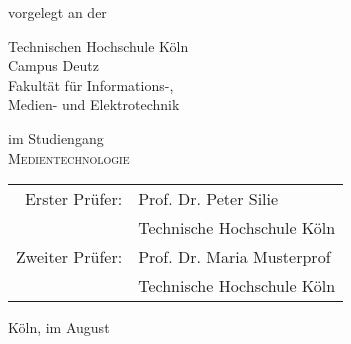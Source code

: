 \begin{titlepage}
\begin{center}
\vspace{0.6cm}

\begin{large}
vorgelegt an der\\ 
\vspace{0.2cm}
\begin{scshape}
Technischen Hochschule Köln\\
Campus Deutz\\
Fakultät für Informations-,\\
Medien- und Elektrotechnik\\

\end{scshape}
\end{large}

\vspace{0.6cm}

\begin{large}
im Studiengang\\ 
\vspace{0.1cm}
\textsc{Medientechnologie}
\end{large}


\vspace{1.2cm}

\begin{tabular}{rl}
        Erster Prüfer:  &  Prof. Dr. Peter Silie\\
       					&  \small Technische Hochschule Köln \\[1.0em]
       Zweiter Prüfer:  &  Prof. Dr. Maria Musterprof\\
       					&  \small Technische Hochschule Köln\\
\end{tabular}

\vspace{1.2cm}

\begin{large}
Köln, im August \the\year
\end{large}


\end{center}
\end{titlepage}
